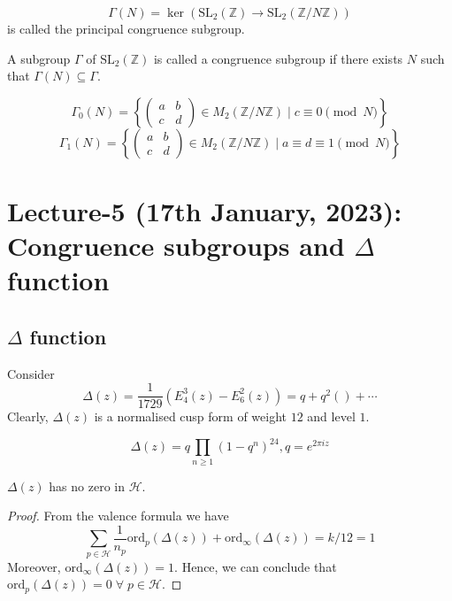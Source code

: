 \documentclass[oneside, 12pt]{scrbook}
\newcommand{\ZZ}{\mathbb Z}
\newcommand{\ord}{\mathrm{ord}}
\newcommand{\Hh}{\mathcal{H}}
\theoremstyle{theorem}
\begin{document}
\begin{definition}
$$\Gamma (N) = \ker (\mathrm{SL}_{2}(\ZZ) \rightarrow \mathrm{SL}_{2}(\ZZ / N \ZZ))$$ is called the principal congruence subgroup.
\end{definition}

\begin{definition}
A subgroup $\Gamma$ of $\mathrm{SL}_{2}(\ZZ)$ is called a congruence subgroup if there exists $N$ such that $\Gamma (N) \subseteq \Gamma$.
\end{definition}

$$\Gamma_{0}(N) =\left\{ \begin{pmatrix}
a & b \\ c & d
\end{pmatrix} \in M_{2}(\ZZ / N \ZZ) \mid c\equiv 0 \pmod{N} \right\}$$
$$\Gamma_{1}(N) =\left\{ \begin{pmatrix}
a & b \\ c & d
\end{pmatrix} \in M_{2}(\ZZ / N \ZZ) \mid a\equiv d \equiv 1 \pmod{N} \right\}$$


\chapter{Lecture-5 (17th January, 2023): Congruence subgroups and $\Delta$ function}

\section{$\Delta$ function}

Consider $$\Delta (z) = \frac{1}{1729} (E_{4}^3(z) - E_{6}^2(z)) = q + q^2() + \cdots $$
Clearly, $\Delta(z)$ is a normalised cusp form of weight $12$ and level $1$. 

\begin{theorem}
$$\Delta (z) = q \prod_{n \geq 1} (1-q^{n})^{24}, q=e^{2\pi i z}$$
\end{theorem}

\begin{proposition}
$\Delta(z)$ has no zero in $\Hh$.
\end{proposition}

\begin{proof}
From the valence formula we have $$\sum_{p \in \Hh} \frac{1}{n_{p}} \ord_{p}(\Delta(z)) + \ord_{\infty} (\Delta(z)) = k/12 =1$$ Moreover, $\ord_{\infty} (\Delta(z))=1$. Hence, we can conclude that $\ord_{p}(\Delta(z)) =0 \; \forall \; p \in \Hh$.
\end{proof}
\end{document}
